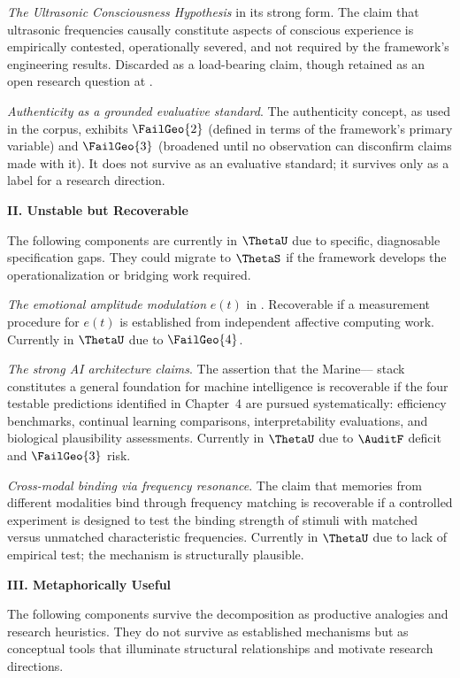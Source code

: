 \textit{The Ultrasonic Consciousness Hypothesis} in
its strong form. The claim that ultrasonic frequencies
causally constitute aspects of conscious experience
is empirically contested, operationally severed, and
not required by the framework's engineering results.
Discarded as a load-bearing claim, though retained as
an open research question at \LevelI{}.

\textit{Authenticity as a grounded evaluative standard}.
The authenticity concept, as used in the corpus, exhibits
$\FailGeo{2}$ (defined in terms of the framework's
primary variable) and $\FailGeo{3}$ (broadened until
no observation can disconfirm claims made with it).
It does not survive as an evaluative standard; it
survives only as a label for a research direction.

\bigskip
\noindent\textbf{II. Unstable but Recoverable}

\medskip

The following components are currently in $\ThetaU$
due to specific, diagnosable specification gaps. They
could migrate to $\ThetaS$ if the framework develops
the operationalization or bridging work required.

\textit{The emotional amplitude modulation} $e(t)$
in \MEMeight{}. Recoverable if a measurement procedure
for $e(t)$ is established from independent affective
computing work. Currently in $\ThetaU$ due to $\FailGeo{4}$.

\textit{The strong AI architecture claims}. The assertion
that the Marine--\MEMeight{}--\HCFone{} stack constitutes
a general foundation for machine intelligence is recoverable
if the four testable predictions identified in Chapter~4
are pursued systematically: efficiency benchmarks, continual
learning comparisons, interpretability evaluations, and
biological plausibility assessments. Currently in $\ThetaU$
due to $\AuditF$ deficit and $\FailGeo{3}$ risk.

\textit{Cross-modal binding via frequency resonance}.
The claim that memories from different modalities bind
through frequency matching is recoverable if a controlled
experiment is designed to test the binding strength
of stimuli with matched versus unmatched characteristic
frequencies. Currently in $\ThetaU$ due to lack of
empirical test; the mechanism is structurally plausible.

\bigskip
\noindent\textbf{III. Metaphorically Useful}

\medskip

The following components survive the decomposition as
productive \LevelII{} analogies and research heuristics.
They do not survive as established mechanisms but as
conceptual tools that illuminate structural relationships
and motivate research directions.

